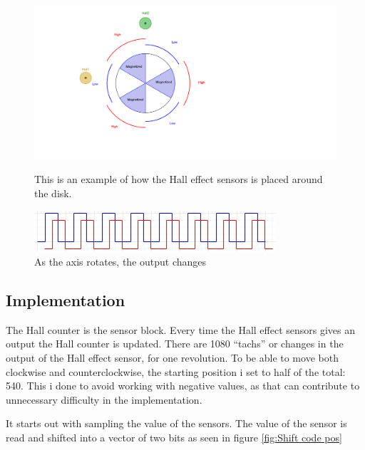 \begin{figure}[h!]
  \centering
  \begin{minipage}[b]{0.6\textwidth}
    \includegraphics[width=\textwidth]{Billeder/FPGA/Motor_Magnets.png}
    \caption{This is an example of how the Hall effect sensors is placed around the disk.}
    \label{Motor_magnet}
  \end{minipage}
  \hfill
  \begin{minipage}[b]{0.3\textwidth}
    \includegraphics[width=\textwidth]{Billeder/FPGA/Hallcounteksemple.PNG}
    \caption{As the axis rotates, the output changes}
    \label{Hallcounteksemple}
  \end{minipage}
\end{figure}

\subsection{Implementation}

The Hall counter is the sensor block.
Every time the Hall effect sensors gives an output the Hall counter is updated. There are 1080 “tachs” or changes in the output of the Hall effect sensor, for one revolution. To be able to move both clockwise and counterclockwise, the starting position i set to half of the total: 540.
This i done to avoid working with negative values, as that can contribute to unnecessary difficulty in the implementation.

It starts out with sampling the value of the sensors. The value of the sensor is read and shifted into a vector of two bits as seen in figure \ref{fig:Shift code pos}

